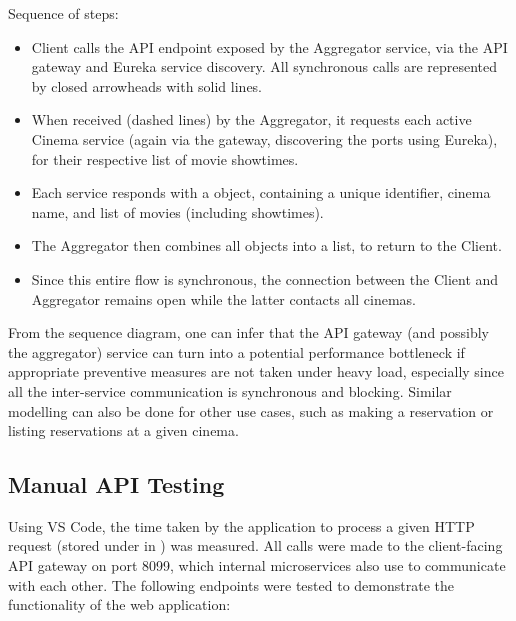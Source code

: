 Sequence of steps:
\begin{itemize}
  \item Client calls the API endpoint  exposed by the Aggregator service, via the API gateway and Eureka service discovery. All synchronous calls are represented by closed arrowheads with solid lines.
  \item When received (dashed lines) by the Aggregator, it requests each active Cinema service (again via the gateway, discovering the ports using Eureka), for their respective list of movie showtimes.
  \item Each service responds with a  object, containing a unique identifier, cinema name, and list of movies (including showtimes).
  \item The Aggregator then combines all  objects into a list, to return to the Client.
  \item Since this entire flow is synchronous, the connection between the Client and Aggregator remains open while the latter contacts all cinemas.
\end{itemize}

From the sequence diagram, one can infer that the API gateway (and possibly the aggregator) service can turn into a potential performance bottleneck if appropriate preventive measures are not taken under heavy load, especially since all the inter-service communication is synchronous and blocking. Similar modelling can also be done for other use cases, such as making a reservation or listing reservations at a given cinema.

\subsection{Manual API Testing}

Using VS Code, the time taken by the application to process a given HTTP request (stored under  in ) was measured. All calls were made to the client-facing API gateway on port 8099, which internal microservices also use to communicate with each other. The following endpoints were tested to demonstrate the functionality of the web application:

